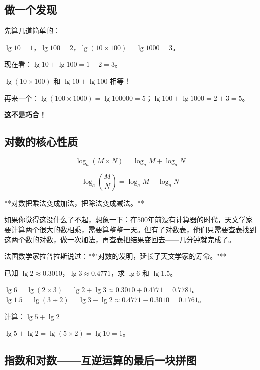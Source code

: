 \subsection*{做一个发现}

先算几道简单的：

$\lg 10 = 1$，$\lg 100 = 2$，$\lg(10\times100) = \lg 1000 = 3$。

现在看：$\lg 10 + \lg 100 = 1 + 2 = 3$。

$\lg(10\times100)$ 和 $\lg 10 + \lg 100$ 相等！

再来一个：$\lg(100\times1000) = \lg 100000 = 5$；$\lg 100 + \lg 1000 = 2 + 3 = 5$。

\textbf{这不是巧合！}

\subsection*{对数的核心性质}

\[
\log_a (M\times N) = \log_a M + \log_a N
\]

\[
\log_a \left(\frac{M}{N}\right) = \log_a M - \log_a N
\]

**对数把乘法变成加法，把除法变成减法。**

如果你觉得这没什么了不起，想象一下：在500年前没有计算器的时代，天文学家要计算两个很大的数相乘，需要算整整一天。但有了对数表，他们只需要查表找到这两个数的对数，做一次加法，再查表把结果变回去——几分钟就完成了。

法国数学家拉普拉斯说过：**"对数的发明，延长了天文学家的寿命。"**

\begin{example}
已知 $\lg 2\approx0.3010$，$\lg 3\approx0.4771$，求 $\lg 6$ 和 $\lg 1.5$。
\end{example}
\begin{solution}
$\lg 6 = \lg(2\times3) = \lg 2 + \lg 3 \approx 0.3010+0.4771 = 0.7781$。\\
$\lg 1.5 = \lg(3\div2) = \lg 3 - \lg 2 \approx 0.4771-0.3010 = 0.1761$。
\end{solution}

\begin{example}
计算：$\lg 5 + \lg 2$
\end{example}
\begin{solution}
$\lg 5 + \lg 2 = \lg(5\times2) = \lg 10 = 1$。
\end{solution}

\subsection*{指数和对数——互逆运算的最后一块拼图}

